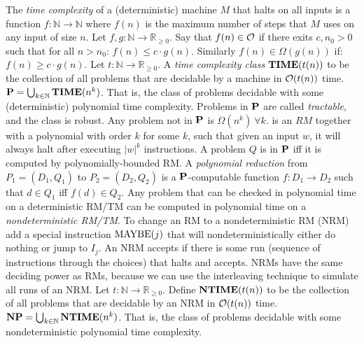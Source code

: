  The \textit{time complexity} of a (deterministic) machine $M$ that halts on all inputs is a function $f : \mathbb{N} \to \mathbb{N}$ where $f(n)$ is the maximum number of steps that $M$ uses on any input of size $n$.
 Let $f,g : \mathbb{N} \to \mathbb{R}_{\ge 0}$. Say that $f(n) \in \operatorname{\mathcal{O}}$ if there exits $c, n_0 > 0$ such that for all $n > n_0$: 
$f(n) \le c \cdot g(n)$.
Similarly $f(n) \in \Omega(g(n))$ if: 
$f(n) \ge c \cdot g(n)$.
 Let $t : \mathbb{N} \to \mathbb{R}_{\ge 0}$. A \textit{time complexity class} $\operatorname{\mathbf{TIME}}(t(n))$ to be the collection of all problems that are decidable by a machine in $\operatorname{\mathcal{O}}(t(n))$ time.
 $\operatorname{\mathbf{P}} = \bigcup_{k \in \mathbb{N}} \operatorname{\mathbf{TIME}}(n^k)$. That is, the class of problems decidable with some (deterministic) polynomial time complexity. Problems in $\operatorname{\mathbf{P}}$ are called \textit{tractable}, and the class is robust.
Any problem not in $\operatorname{\mathbf{P}}$ is $\Omega(n^k)\ \forall k$.
 is an $RM$ together with a polynomial with order $k$ for some $k$, such that given an input $w$, it will always halt after executing $|w|^k$ instructions. A problem $Q$ is in $\operatorname{\mathbf{P}}$ iff it is computed by polynomially-bounded RM.
 A \textit{polynomial reduction} from $P_1 = (D_1, Q_1)$ to $P_2 = (D_2, Q_2)$ is a $\operatorname{\mathbf{P}}$-computable function $f: D_1 \to D_2$ such that $d \in Q_1$ iff $f(d) \in Q_2$.
 Any problem that can be checked in polynomial time on a deterministic RM/TM can be computed in polynomial time on a \emph{nondeterministic RM/TM}.
 To change an RM to a nondeterministic RM (NRM) add a special instruction $\operatorname{MAYBE}(j)$ that will nondeterministically either do nothing or jump to $I_j$.
 An NRM accepts if there is some run (sequence of instructions through the choices) that halts and accepts.
 NRMs have the same deciding power as RMs, because we can use the interleaving technique to simulate all runs of an NRM.
\wde{$\NTIME$} Let $t : \mathbb{N} \to \mathbb{R}_{\ge 0}$. Define $\operatorname{\mathbf{NTIME}}(t(n))$ to be the collection of all problems that are decidable by an NRM in $\operatorname{\mathcal{O}}(t(n))$ time.
\wde{$\NP$}  $\operatorname{\mathbf{NP}} = \bigcup_{k \in \mathbb{N}} \operatorname{\mathbf{NTIME}}(n^k)$. That is, the class of problems decidable with some nondeterministic polynomial time complexity.

